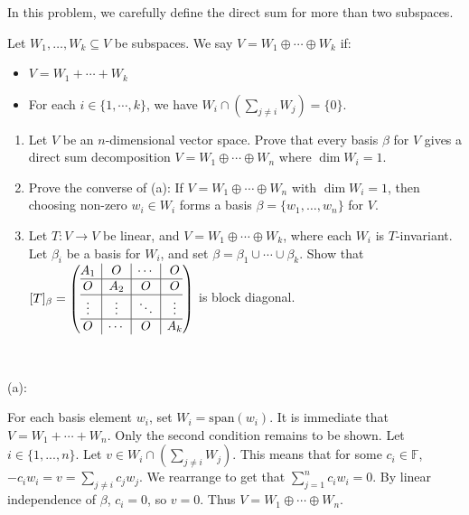 \documentclass{eh-homework}
\begin{document}
    \newpage
    \begin{question}{9}
    In this problem, we carefully define the direct sum for more than two subspaces.
    
    Let $W_1, \ldots, W_k \subseteq V$ be subspaces. We say $V = W_1 \oplus \cdots \oplus W_k$ if:
    \begin{itemize}
        \item \(V = W_1 + \cdots + W_k\)
        \item For each \(i \in \{ 1, \cdots, k \}\), we have \(W_i \cap \left( \sum_{j\neq i} W_j \right) = \{ 0 \}\).
    \end{itemize}
    
    \begin{enumerate}[label=(\alph*)]
        \item Let \(V\) be an \(n\)-dimensional vector space. Prove that every basis \(\beta\) for \(V\) gives a direct sum decomposition \(V = W_1 \oplus \cdots \oplus W_n\) where \(\dim W_i = 1\).
        \item Prove the converse of (a): If $V = W_1 \oplus \cdots \oplus W_n$ with $\dim W_i = 1$, then choosing non-zero $w_i \in W_i$ forms a basis \(\beta = \{ w_1, \ldots, w_n \}\) for $V$.
        \item Let $T : V \to V$ be linear, and \(V = W_1 \oplus \cdots \oplus W_k\), where each \(W_i\) is \(T\)-invariant. Let \(\beta _i\) be a basis for \(W_i\), and set \(\beta = \beta _1 \cup \cdots \cup \beta _k\). Show that $[T]_\beta = \left( \begin{array}{@{}c|c|c|c@{}}
            A_1 & O & \cdots & O \\
            \hline
            O & A_2 & O & O \\
            \hline
            \vdots & \vdots & \ddots & \vdots \\
            \hline
            O & \cdots & O & A_k \\
        \end{array} \right) $ is block diagonal.
    \end{enumerate}
    \tcblower
    \ 

    (a):

    For each basis element \(w_i\), set \(W_i = \mathrm{span} (w_i)\). It is immediate that \(V = W_1 + \cdots + W_n\). Only the second condition remains to be shown. Let \(i \in \{ 1, ..., n \}\). Let \(v \in W_i \cap \left( \sum_{j\neq i} W_j \right)\). This means that for some \(c_i \in \mathbb{F}\), \(-c_i w_i = v = \sum_{j\neq i} c_j w_j\). We rearrange to get that \(\sum_{j=1}^{n} c_i w_i = 0\). By linear independence of \(\beta\), \(c_i = 0\), so \(v = 0\). Thus \(V = W_1 \oplus \cdots \oplus W_n\).


\end{question}
\end{document}
